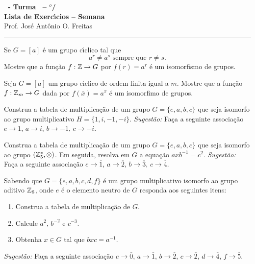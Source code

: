 \documentclass[12pt]{exam}
\begin{document}
\begin{center}

    {\Large\bf \disciplina\ - Turma \turma\ -- \semestre$^{o}$/\ano} \\ \vspace{9pt} {\large\bf
        Lista de Exerc{\'\i}cios -- Semana \numerosemana}\\ \vspace{9pt} Prof. Jos{\'e} Ant{\^o}nio O. Freitas
    \end{center}
    \hrule

    \vspace{.6cm}

    \questao{} Se $G = [a]$ \'e um grupo c{\'\i}clico tal que
    \[
        a^r \ne a^s \mbox{ sempre que } r \ne s.
    \]
    Mostre que a fun\c{c}\~ao $f : \mathbb{Z} \to G$ por $f(r) = a^r$ \'e um isomorfismo de grupos.

    \vspace{.3cm}

    \questao{} Seja $G = [a]$ um grupo c{\'\i}clico de ordem finita igual a $m$. Mostre que a fun\c{c}\~ao $f : \mathbb{Z}_m \to G$ dada por $f(\overline{x}) = a^x$ \'e um isomorfimo de grupos.

    \vspace{.3cm}

    \questao{} Construa a tabela de multiplica\c{c}\~ao de um grupo $G = \{e, a, b, c\}$ que seja isomorfo ao grupo multiplicativo $H = \{1, i, -1, -i\}$.
    \textit{Sugest\~ao:} Fa\c{c}a a seguinte associa\c{c}\~ao $e \to 1$, $a \to i$, $b \to -1$, $c \to -i$.

    \vspace{.3cm}

    \questao{} Construa a tabela de multiplica\c{c}\~ao de um grupo $G = \{e, a, b, c\}$ que seja isomorfo ao grupo $(\mathbb{Z}_5^*, \otimes)$. Em seguida, resolva em $G$ a equa\c{c}\~ao $axb^{-1} = c^2$.
    \textit{Sugest\~ao:} Fa\c{c}a a seguinte associa\c{c}\~ao $e \to \overline{1}$, $a \to \overline{2}$, $b \to \overline{3}$, $c \to \overline{4}$.

    \vspace{.3cm}

    \questao{} Sabendo que $G = \{e, a, b, c, d, f\}$ \'e um grupo multiplicativo isomorfo ao grupo aditivo $\mathbb{Z}_6$, onde $e$ \'e o elemento neutro de $G$ responda aos seguintes itens:
    \begin{enumerate}[label=({\alph*})]
      \item Construa a tabela de multiplica\c{c}\~ao de $G$.

      \item Calcule $a^2$, $b^{-2}$ e $c^{-3}$.

      \item Obtenha $x \in G$ tal que $bxc = a^{-1}$.
    \end{enumerate}
    \textit{Sugest\~ao:} Fa\c{c}a a seguinte associa\c{c}\~ao $e \to \overline{0}$, $a \to \overline{1}$, $b \to \overline{2}$, $c \to \overline{2}$, $d \to \overline{4}$, $f \to \overline{5}$.
\end{document}
